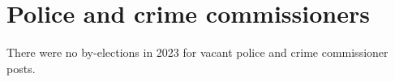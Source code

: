 \documentclass[a4paper,openany]{book}
\begin{document}
%
%

\section{Police and crime commissioners}

There were no by-elections in 2023 for vacant police and crime commissioner posts.
\end{document}
